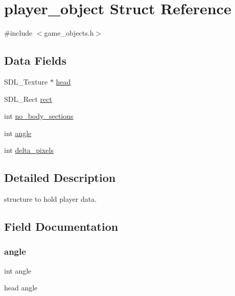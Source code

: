 \hypertarget{structplayer__object}{}\section{player\+\_\+object Struct Reference}
\label{structplayer__object}


{\ttfamily \#include $<$game\+\_\+objects.\+h$>$}

\subsection*{Data Fields}
\begin{DoxyCompactItemize}
\item 
S\+D\+L\+\_\+\+Texture $\ast$ \mbox{\hyperlink{structplayer__object_a156af47b8be9c09879c063ad443877a5}{head}}
\item 
S\+D\+L\+\_\+\+Rect \mbox{\hyperlink{structplayer__object_a55aefd071649ac9dd8133e2d8a52d11f}{rect}}
\item 
int \mbox{\hyperlink{structplayer__object_a06948963e49fd8de64945937788fc3f8}{no\+\_\+body\+\_\+sections}}
\item 
int \mbox{\hyperlink{structplayer__object_a63177970cacb40efba67ce501ea89210}{angle}}
\item 
int \mbox{\hyperlink{structplayer__object_a77755677639f5b9ca5232209f93bbb41}{delta\+\_\+pixels}}
\end{DoxyCompactItemize}


\subsection{Detailed Description}
structure to hold player data. 

\subsection{Field Documentation}
\mbox{\label{structplayer__object_a63177970cacb40efba67ce501ea89210}} 
\subsubsection{\texorpdfstring{angle}{angle}}
{\footnotesize\ttfamily int angle}

head angle \mbox{\label{structplayer__object_a77755677639f5b9ca5232209f93bbb41}} 
